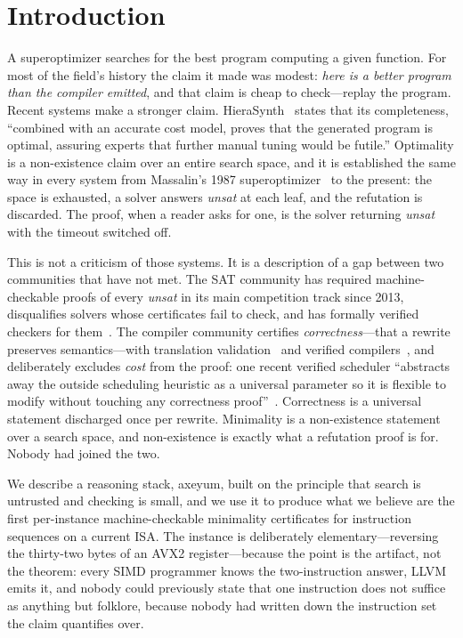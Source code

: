 \section{Introduction}
\label{sec:intro}

A superoptimizer searches for the best program computing a given function. For most of the field's history the claim it made was modest: \emph{here is a better program than the compiler emitted}, and that claim is cheap to check---replay the program. Recent systems make a stronger claim. HieraSynth~\cite{hierasynth} states that its completeness, \enquote{combined with an accurate cost model, proves that the generated program is optimal, assuring experts that further manual tuning would be futile.} Optimality is a non-existence claim over an entire search space, and it is established the same way in every system from Massalin's 1987 superoptimizer~\cite{massalin} to the present: the space is exhausted, a solver answers \emph{unsat} at each leaf, and the refutation is discarded. The proof, when a reader asks for one, is the solver returning \emph{unsat} with the timeout switched off.

This is not a criticism of those systems. It is a description of a gap between two communities that have not met. The SAT community has required machine-checkable proofs of every \emph{unsat} in its main competition track since 2013, disqualifies solvers whose certificates fail to check, and has formally verified checkers for them~\cite{cakelpr}. The compiler community certifies \emph{correctness}---that a rewrite preserves semantics---with translation validation~\cite{alive2} and verified compilers~\cite{compcert}, and deliberately excludes \emph{cost} from the proof: one recent verified scheduler \enquote{abstracts away the outside scheduling heuristic as a universal parameter so it is flexible to modify without touching any correctness proof}~\cite{yang2024}. Correctness is a universal statement discharged once per rewrite. Minimality is a non-existence statement over a search space, and non-existence is exactly what a refutation proof is for. Nobody had joined the two.

We describe a reasoning stack, axeyum, built on the principle that search is untrusted and checking is small, and we use it to produce what we believe are the first per-instance machine-checkable minimality certificates for instruction sequences on a current ISA. The instance is deliberately elementary---reversing the thirty-two bytes of an AVX2 register---because the point is the artifact, not the theorem: every SIMD programmer knows the two-instruction answer, LLVM emits it, and nobody could previously state that one instruction does not suffice as anything but folklore, because nobody had written down the instruction set the claim quantifies over.

